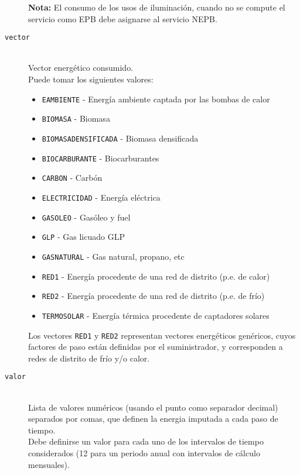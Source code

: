 \documentclass[10pt,notitlepage,oneside,a4paper]{article}
\begin{document}
\begin{description}
\begin{myquote}
              \textbf{Nota:} El consumo de los usos de iluminación, cuando no se compute el servicio como EPB debe asignarse al servicio NEPB.
          \end{myquote}

    \item [\texttt{vector}] \hfill \\
          Vector energético consumido.\\
          Puede tomar los siguientes valores:
          \begin{multicols}{2}
              \begin{itemize}
                  \item \texttt{EAMBIENTE} - Energía ambiente captada por las bombas de calor
                  \item \texttt{BIOMASA} - Biomasa
                  \item \texttt{BIOMASADENSIFICADA} - Biomasa densificada
                  \item \texttt{BIOCARBURANTE} - Biocarburantes
                  \item \texttt{CARBON} - Carbón
                  \item \texttt{ELECTRICIDAD} - Energía eléctrica
                  \item \texttt{GASOLEO} - Gasóleo y fuel
                  \item \texttt{GLP} - Gas licuado GLP
                  \item \texttt{GASNATURAL} - Gas natural, propano, etc
                  \item \texttt{RED1} - Energía procedente de una red de distrito (p.e. de calor)
                  \item \texttt{RED2} - Energía procedente de una red de distrito (p.e. de frío)
                  \item \texttt{TERMOSOLAR} - Energía térmica procedente de captadores solares
              \end{itemize}
          \end{multicols}

          Los vectores \texttt{RED1} y \texttt{RED2} representan vectores energéticos genéricos, cuyos factores de paso están definidas por el suministrador, y corresponden a redes de distrito de frío y/o calor.

    \item [\texttt{valor}] \hfill \\
          Lista de valores numéricos (usando el punto como separador decimal) separados por comas, que definen la energia imputada a cada paso de tiempo.\\
          Debe definirse un valor para cada uno de los intervalos de tiempo considerados (12 para un periodo anual con intervalos de cálculo mensuales).


\end{description}
\end{document}
